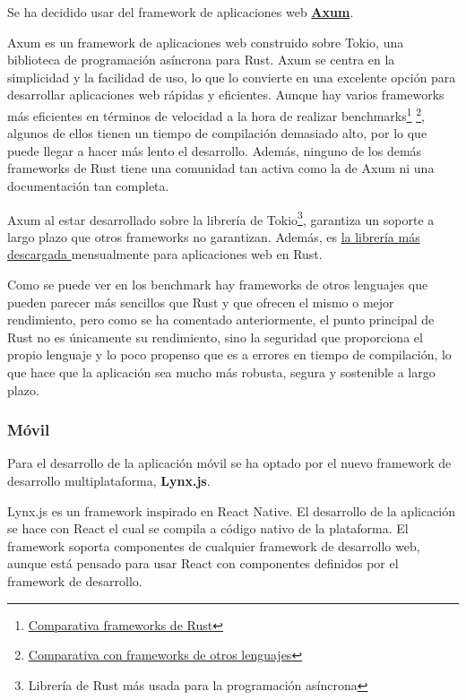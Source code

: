 Se ha decidido usar del framework de aplicaciones web \href{https://github.com/tokio-rs/axum?tab=readme-ov-file}{\textbf{Axum}}.

Axum es un framework de aplicaciones web construido sobre Tokio, una biblioteca de programación asíncrona para Rust. Axum se centra en la simplicidad y la facilidad de uso, lo que lo convierte en una excelente opción para desarrollar aplicaciones web rápidas y eficientes.
Aunque hay varios frameworks más eficientes en términos de velocidad a la hora de realizar benchmarks\footnote{\href{https://web-frameworks-benchmark.netlify.app/result?l=rust}{Comparativa frameworks de Rust}} \footnote{\href{https://www.techempower.com/benchmarks/\#section=data-r21&test=composite&hw=ph}{Comparativa con frameworks de otros lenguajes}}, algunos de ellos tienen un tiempo de compilación demasiado alto, por lo que puede llegar a hacer más lento el desarrollo.
Además, ninguno de los demás frameworks de Rust tiene una comunidad tan activa como la de Axum ni una documentación tan completa.

Axum al estar desarrollado sobre la librería de Tokio\footnote{Librería de Rust más usada para la programación asíncrona}, garantiza un soporte a largo plazo que otros frameworks no garantizan. Además, es \href{https://lib.rs/crates/axum}{la librería más descargada }mensualmente para aplicaciones web en Rust.

Como se puede ver en los benchmark hay frameworks de otros lenguajes que pueden parecer más sencillos que Rust y que ofrecen el mismo o mejor rendimiento, pero como se ha comentado anteriormente, el punto principal de Rust no es únicamente su rendimiento, sino la seguridad que proporciona el propio lenguaje y lo poco propenso que es a errores en tiempo de compilación, lo que hace que la aplicación sea mucho más robusta, segura y sostenible a largo plazo.


\subsubsection{Móvil}
Para el desarrollo de la aplicación móvil se ha optado por el nuevo framework de desarrollo multiplataforma, \textbf{Lynx.js}.

Lynx.js es un framework inspirado en React Native. El desarrollo de la aplicación se hace con React el cual se compila a código nativo de la plataforma. El framework soporta componentes de cualquier framework de desarrollo web, aunque está pensado para usar React con componentes definidos por el framework de desarrollo.

